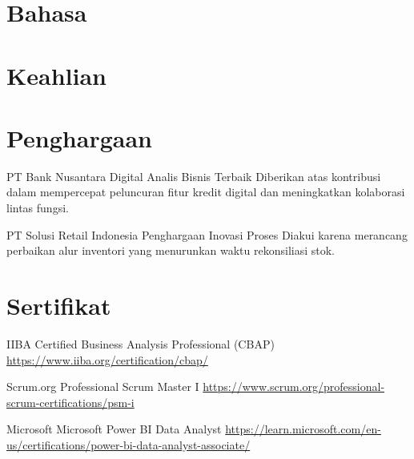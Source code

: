 \documentclass[a4paper, serif, 10pt]{moderncv}
\begin{document}
\section{Bahasa}

\section{Keahlian}

\section{Penghargaan}

        {PT Bank Nusantara Digital}
        {Analis Bisnis Terbaik}
        {}
        {}
        {Diberikan atas kontribusi dalam mempercepat peluncuran fitur kredit digital dan meningkatkan kolaborasi lintas fungsi.}

        {PT Solusi Retail Indonesia}
        {Penghargaan Inovasi Proses}
        {}
        {}
        {Diakui karena merancang perbaikan alur inventori yang menurunkan waktu rekonsiliasi stok.}
\section{Sertifikat}

        {IIBA}
        {Certified Business Analysis Professional (CBAP)}
        {\url{https://www.iiba.org/certification/cbap/}}
        {}
        {}

        {Scrum.org}
        {Professional Scrum Master I}
        {\url{https://www.scrum.org/professional-scrum-certifications/psm-i}}
        {}
        {}

        {Microsoft}
        {Microsoft Power BI Data Analyst}
        {\url{https://learn.microsoft.com/en-us/certifications/power-bi-data-analyst-associate/}}
        {}
        {}
\end{document}
